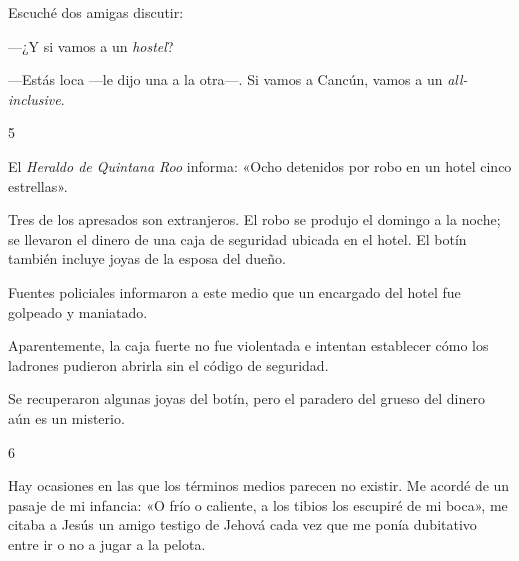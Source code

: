 \documentclass[12pt,twoside,openright,a5paper]{book}
\begin{document}
\nopagebreak

\vspace{0.5cm}

\nopagebreak

Escuché dos amigas discutir: 

---¿Y si vamos a un \emph{hostel}?

---Estás loca ---le
dijo una a la otra---. Si vamos a Cancún, vamos a un \emph{all-inclusive}.


\vspace{0.5cm}

\hrulefill \hspace{0.1cm}\decofourleft\hspace{0.2cm} 5 \hspace{0.2cm}\decofourright \hspace{0.1cm}\hrulefill

\nopagebreak

\vspace{0.5cm}

\nopagebreak

El \emph{Heraldo de Quintana Roo} informa: «Ocho detenidos por robo en un hotel
cinco estrellas».

Tres de los apresados son extranjeros. El robo se produjo el domingo a la
noche; se llevaron el dinero de una caja de seguridad ubicada en el
hotel. El botín también incluye joyas de la esposa del dueño.

Fuentes policiales informaron a este medio que un encargado del hotel fue
golpeado y maniatado.

Aparentemente, la caja fuerte no fue violentada e intentan establecer cómo
los ladrones pudieron abrirla sin el código de seguridad.

Se recuperaron algunas joyas del botín, pero el paradero del grueso del
dinero aún es un misterio.

\vspace{0.5cm}

\hrulefill \hspace{0.1cm}\decofourleft\hspace{0.2cm} 6 \hspace{0.2cm}\decofourright \hspace{0.1cm}\hrulefill

\nopagebreak

\vspace{0.5cm}

\nopagebreak

Hay ocasiones en las que los términos medios parecen no existir.
Me acordé de un pasaje de mi infancia: «O frío o caliente, a los tibios los escupiré de mi boca», me citaba a Jesús un
amigo testigo de Jehová cada vez que me ponía dubitativo entre ir o no
a jugar a la pelota.
\end{document}
